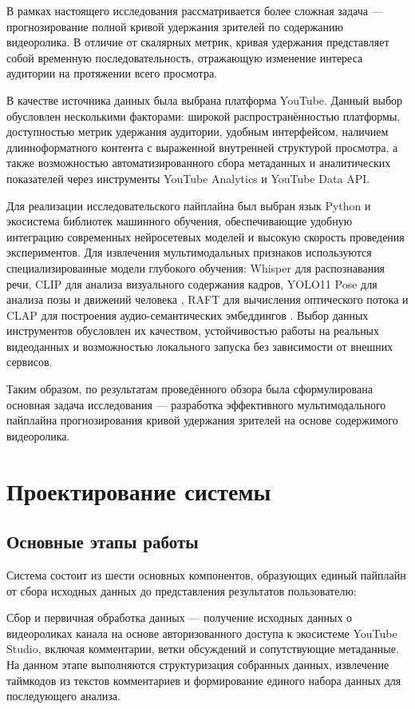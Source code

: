 \documentclass[times]{itmo-student-thesis}
\begin{document}
В рамках настоящего исследования рассматривается более сложная задача — прогнозирование полной кривой удержания зрителей по содержанию видеоролика. В отличие от скалярных метрик, кривая удержания представляет собой временную последовательность, отражающую изменение интереса аудитории на протяжении всего просмотра.

В качестве источника данных была выбрана платформа YouTube. Данный выбор обусловлен несколькими факторами: широкой распространённостью платформы, доступностью метрик удержания аудитории, удобным интерфейсом, наличием длинноформатного контента с выраженной внутренней структурой просмотра, а также возможностью автоматизированного сбора метаданных и аналитических показателей через инструменты YouTube Analytics и YouTube Data API.

Для реализации исследовательского пайплайна был выбран язык Python и экосистема библиотек машинного обучения, обеспечивающие удобную интеграцию современных нейросетевых моделей и высокую скорость проведения экспериментов. Для извлечения мультимодальных признаков используются специализированные модели глубокого обучения: Whisper для распознавания речи, CLIP для анализа визуального содержания кадров, YOLO11 Pose для анализа позы и движений человека \cite{ultralytics2026yolo11}, RAFT для вычисления оптического потока \cite{teed2020raft} и CLAP для построения аудио-семантических эмбеддингов \cite{elizalde2022clap}. Выбор данных инструментов обусловлен их качеством, устойчивостью работы на реальных видеоданных и возможностью локального запуска без зависимости от внешних сервисов.

Таким образом, по результатам проведённого обзора была сформулирована основная задача исследования — разработка эффективного мультимодального пайплайна прогнозирования кривой удержания зрителей на основе содержимого видеоролика.

\chapter{Проектирование системы}

\section{Основные этапы работы}

Система состоит из шести основных компонентов, образующих единый пайплайн от сбора исходных данных до представления результатов пользователю:

Сбор и первичная обработка данных — получение исходных данных о видеороликах канала на основе авторизованного доступа к экосистеме YouTube Studio, включая комментарии, ветки обсуждений и сопутствующие метаданные. На данном этапе выполняются структуризация собранных данных, извлечение таймкодов из текстов комментариев и формирование единого набора данных для последующего анализа.
\end{document}
